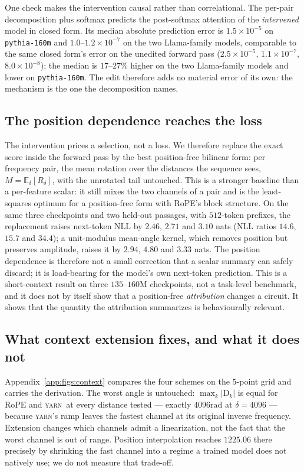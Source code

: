 \documentclass{article}
\theoremstyle{plain}
\theoremstyle{remark}
\newcommand{\yarn}{\textsc{yarn}}
\newcommand{\R}{R}
\newcommand{\D}{\mathrm{D}_k}
\newcommand{\rad}{\mathrm{rad}}
\begin{document}
One check makes the intervention causal rather than correlational. The per-pair
decomposition plus softmax predicts the post-softmax attention of the
\emph{intervened} model in closed form. Its median absolute prediction error is
$1.5\times10^{-5}$ on \texttt{pythia-160m} and $1.0$--$1.2\times10^{-7}$ on the
two Llama-family models, comparable to the same closed form's error on the
unedited forward pass ($2.5\times10^{-5}$, $1.1\times10^{-7}$,
$8.0\times10^{-8}$); the median is $17$--$27\%$ higher on the two Llama-family
models and lower on \texttt{pythia-160m}. The edit therefore adds no material
error of its own: the mechanism is the one the decomposition names.

\subsection{The position dependence reaches the loss}
\label{sec:downstream}

The intervention prices a selection, not a loss. We therefore replace the exact
score inside the forward pass by the best position-free bilinear form: per
frequency pair, the mean rotation over the distances the sequence sees,
$M=\mathbb{E}_\delta[\R_\delta]$, with the unrotated tail untouched. This is a
stronger baseline than a per-feature scalar: it still mixes the two channels of
a pair and is the least-squares optimum for a position-free form with RoPE's
block structure. On the same three checkpoints and two held-out passages, with
$512$-token prefixes, the replacement raises next-token NLL by $2.46$, $2.71$
and $3.10$ nats (NLL ratios $14.6$, $15.7$ and $34.4$); a unit-modulus
mean-angle kernel, which removes position but preserves amplitude, raises it by
$2.94$, $4.80$ and $3.33$ nats. The position dependence is therefore not a small
correction that a scalar summary can safely discard; it is load-bearing for the
model's own next-token prediction. This is a short-context result on three
$135$--$160$M checkpoints, not a task-level benchmark, and it does not by itself
show that a position-free \emph{attribution} changes a circuit. It shows that
the quantity the attribution summarizes is behaviourally relevant.

\subsection{What context extension fixes, and what it does not}
\label{sec:context}

Appendix~\ref{app:figs:context} compares the four schemes on the $5$-point grid
and carries the derivation. The worst angle is untouched: $\max_k|\D|$ is equal
for RoPE and \yarn\ at every distance tested --- exactly $4096\rad$ at
$\delta = 4096$ --- because \yarn's ramp leaves the fastest channel at its
original inverse frequency. Extension changes which channels admit a
linearization, not the fact that the worst channel is out of range. Position
interpolation reaches $1225.06$ there precisely by shrinking the fast
channel into a regime a trained model does not natively use; we do not measure
that trade-off.
\end{document}
